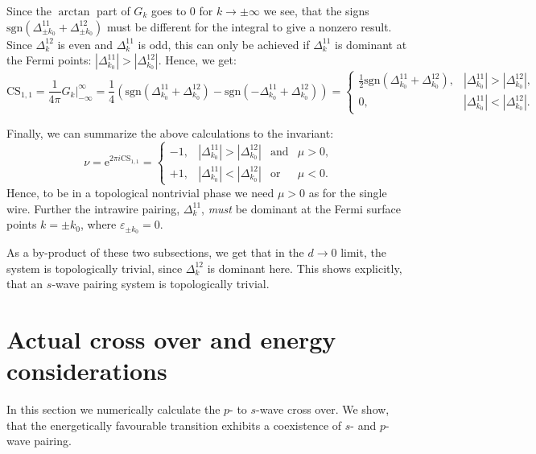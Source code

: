 Since the $\arctan$ part of $G_k$ goes to $0$ for $k\to \pm \infty$ we see, that the signs $\text{sgn}(\Delta^{11}_{\pm k_0} + \Delta^{12}_{\pm k_0})$ must be different for the integral to give a nonzero result. Since $\Delta^{12}_{k}$ is even and $\Delta^{11}_{k}$ is odd, this can only be achieved if $\Delta^{11}_{k}$ is dominant at the Fermi points: $|\Delta^{11}_{k_0}| > |\Delta^{12}_{k_0}|$. Hence, we get:
\begin{equation}
\text{CS}_{1,1} = \frac{1}{4\pi} \left. G_k \right|^\infty_{-\infty} = \frac{1}{4}(\text{sgn}(\Delta^{11}_{k_0} + \Delta^{12}_{k_0}) - \text{sgn}(-\Delta^{11}_{k_0} + \Delta^{12}_{k_0})) = \left\{ \begin{matrix} 
\frac{1}{2}\text{sgn}(\Delta^{11}_{k_0} + \Delta^{12}_{k_0}) , & |\Delta^{11}_{k_0}| > |\Delta^{12}_{k_0}|, \\
0, & |\Delta^{11}_{k_0}| < |\Delta^{12}_{k_0}|.
  \end{matrix} \right. \nonumber 
\end{equation}

Finally, we can summarize the above calculations to the invariant:
\begin{equation}
\nu = \text{e}^{2\pi i \text{CS}_{1,1}} = \left\{ \begin{matrix} 
-1, & |\Delta^{11}_{k_0}| > |\Delta^{12}_{k_0}| & \text{and} & \mu > 0, \\
+1, & |\Delta^{11}_{k_0}| < |\Delta^{12}_{k_0}| & \text{or}  & \mu < 0.
  \end{matrix} \right.
\label{eq.CS11T2eqminus1}
\end{equation}
Hence, to be in a topological nontrivial phase we need $\mu > 0$ as for the single wire. Further the intrawire pairing, $\Delta^{11}_k$, \textit{must} be dominant at the Fermi surface points $k = \pm k_0$, where $\varepsilon_{\pm k_0} = 0$. 

As a by-product of these two subsections, we get that in the $d \to 0$ limit, the system is topologically trivial, since $\Delta^{12}_k$ is dominant here. This shows explicitly, that an $s$-wave pairing system is topologically trivial. 

\section{Actual cross over and energy considerations}
\label{sec.2wiresCrossover_energy}
In this section we numerically calculate the $p$- to $s$-wave cross over. We show, that the energetically favourable transition exhibits a coexistence of $s$- and $p$-wave pairing. 

